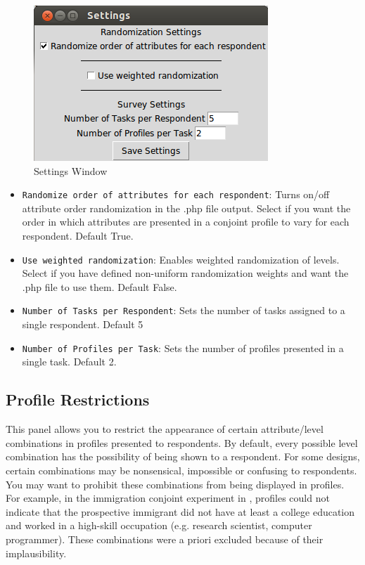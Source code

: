 \documentclass[12pt]{article}
\begin{document}
\begin{figure}[ht!]
\centering\includegraphics[scale=.6]{graphics/settings_screen.png}
\caption{Settings Window}
\end{figure}

\begin{itemize}
\item \texttt{Randomize order of attributes for each respondent}: Turns on/off attribute order randomization in the .php file output. Select if you want the order in which attributes are presented in a conjoint profile to vary for each respondent. Default True.
\item \texttt{Use weighted randomization}: Enables weighted randomization of levels. Select if you have defined non-uniform randomization weights and want the .php file to use them. Default False.
\item \texttt{Number of Tasks per Respondent}: Sets the number of tasks assigned to a single respondent. Default 5
\item \texttt{Number of Profiles per Task}: Sets the number of profiles presented in a single task. Default 2.
\end{itemize}

\subsection{Profile Restrictions}

This panel allows you to restrict the appearance of certain attribute/level combinations in profiles presented to respondents. By default, every possible level combination has the possibility of being shown to a respondent. For some designs, certain combinations may be nonsensical, impossible or confusing to respondents. You may want to prohibit these combinations from being displayed in profiles. For example, in the immigration conjoint experiment in \cite{hainmueller2013}, profiles could not indicate that the prospective immigrant did not have at least a college education and worked in a high-skill occupation (e.g. research scientist, computer programmer). These combinations were a priori excluded because of their implausibility.
\end{document}
